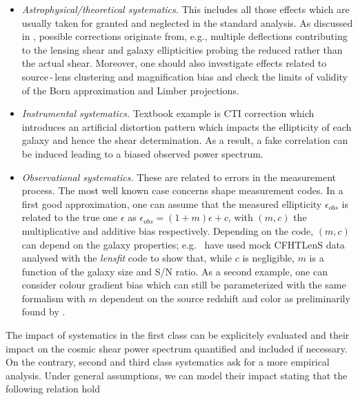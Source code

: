 \begin{itemize}

\item{{\it Astrophysical/theoretical systematics.} This includes all those
effects which are usually taken for granted and neglected in the standard
analysis. As discussed in \cite{2010A&A...523A..28K}, possible corrections
originate from, e.g., multiple deflections contributing to the lensing shear
and galaxy ellipticities probing the reduced rather than the actual shear.
Moreover, one should also investigate effects related to source\,-\,lens
clustering and magnification bias and check the limits of validity of the Born
approximation and Limber projections.} \\

\item{{\it Instrumental systematics.} Textbook example is CTI correction which
introduces an artificial distortion pattern which impacts the ellipticity of
each galaxy and hence the shear determination. As a result, a fake correlation
can be induced leading to a biased observed power spectrum.} \\

\item{{\it Observational systematics.} These are related to errors in the
measurement process. The most well known case concerns shape measurement codes.
In a first good approximation, one can assume that the measured ellipticity
$\epsilon_{obs}$ is related to the true one $\epsilon$ as $\epsilon_{obs} = (1
+ m) \epsilon + c$, with $(m, c)$ the multiplicative and additive bias
respectively. Depending on the code, $(m, c)$ can depend on the galaxy
properties; e.g.~\cite{CFHTLenS-shapes} have used mock CFHTLenS data analysed
with the {\it lensfit} code to show that, while $c$ is negligible, $m$ is a
function of the galaxy size and S/N ratio. As a second example, one can
consider colour gradient bias which can still be parameterized with the same
formalism with $m$ dependent on the source redshift and color as preliminarily
found by \cite{2013MNRAS.432.2385S}.}

\end{itemize}

The impact of systematics in the first class can be explicitely evaluated and their impact on the cosmic shear power spectrum quantified and included if necessary. On the contrary, second and third class systematics ask for a more empirical analysis. Under general assumptions, we can model their impact stating that the following relation hold

